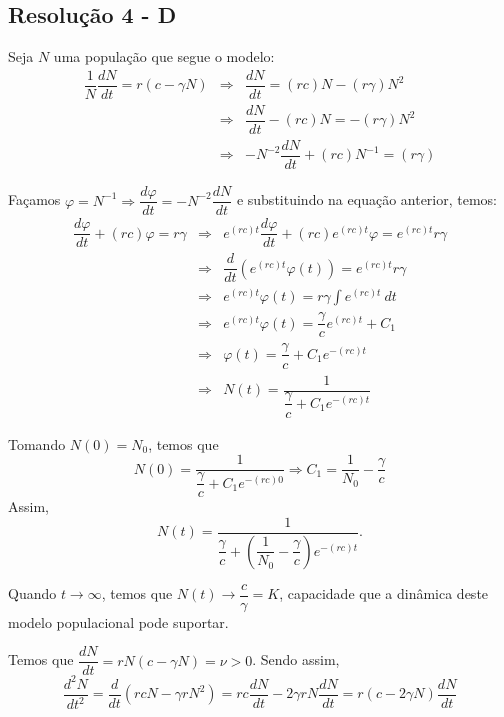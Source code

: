 \subsection*{\blue Resolução 4 - \textbf{D}}

Seja $N$ uma população que segue o modelo:
\[\begin{array}{rcl}
\dfrac{1}{N} \dfrac{dN}{dt} = r (c-\gamma N)
&\Rightarrow&
\dfrac{dN}{dt} = (rc) N - (r\gamma) N^2 \\[0.5cm]
&\Rightarrow&
\dfrac{dN}{dt} - (rc) N =  - (r\gamma) N^2 \\[0.5cm]
&\Rightarrow&
-N^{-2} \dfrac{dN}{dt} + (rc) N^{-1} =  (r\gamma)
\end{array}\]

Façamos \(\varphi = N^{-1} \Rightarrow \dfrac{d\varphi}{dt} = -N^{-2} \dfrac{dN}{dt}\) e substituindo na equação anterior, temos:
\[\begin{array}{rcl}
\dfrac{d\varphi}{dt} + (rc) \varphi =  r\gamma
&\Rightarrow&
e^{(rc)t} \dfrac{d\varphi}{dt} + (rc) e^{(rc)t} \varphi =  e^{(rc)t} r\gamma \\[0.5cm]
&\Rightarrow&
\dfrac{d}{dt}\left(e^{(rc)t}\varphi(t)\right) =  e^{(rc)t} r\gamma \\[0.5cm]
&\Rightarrow&
e^{(rc)t}\varphi(t) = r\gamma \displaystyle\int e^{(rc)t}\ dt \\[0.5cm]
&\Rightarrow&
e^{(rc)t}\varphi(t) = \dfrac{\gamma}{c} e^{(rc)t} + C_1 \\[0.5cm]
&\Rightarrow&
\varphi(t) = \dfrac{\gamma}{c} + C_1 e^{-(rc)t} \\[0.5cm]
&\Rightarrow&
N(t) = \dfrac{1}{\dfrac{\gamma}{c} + C_1 e^{-(rc)t}}
\end{array}\]

Tomando \(N(0) = N_0\), temos que
\[N(0) = \dfrac{1}{\dfrac{\gamma}{c} + C_1 e^{-(rc)0}}
\Rightarrow
C_1 = \dfrac{1}{N_0} - \dfrac{\gamma}{c}
\]
Assim,
\[
N(t) = \dfrac{1}{\dfrac{\gamma}{c} + \left(\dfrac{1}{N_0} - \dfrac{\gamma}{c}\right) e^{-(rc)t}}.
\]

Quando $t \to \infty$, temos que \(N(t) \to \dfrac{c}{\gamma} = K\), capacidade que a dinâmica deste modelo populacional pode suportar.

Temos que \(\dfrac{dN}{dt} = rN(c-\gamma N) = \nu > 0\). Sendo assim,
\[
\dfrac{d^2N}{dt^2}
= \dfrac{d}{dt} (rc N - \gamma r N^2)
= rc \dfrac{dN}{dt} - 2 \gamma r N \dfrac{dN}{dt}
= r(c-2\gamma N) \dfrac{dN}{dt}
\]

